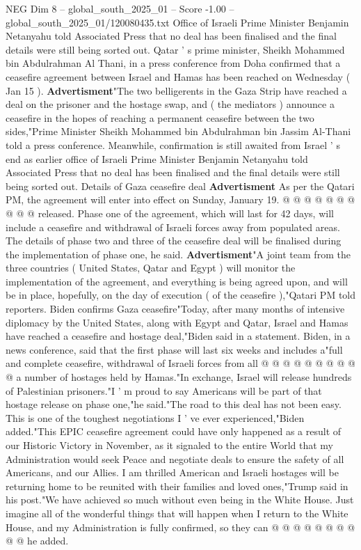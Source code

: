 \begin{textsample}{NEG Dim 8 – global\_south\_2025\_01 – Score -1.00 – global\_south\_2025\_01/120080435.txt}  \label{ex:f8_neg_134}
Office of Israeli Prime Minister Benjamin Netanyahu told Associated Press that no deal has been finalised and the final details were still being sorted out.
Qatar ' s prime minister, Sheikh Mohammed bin Abdulrahman Al Thani, in a press conference from Doha confirmed that a ceasefire agreement between Israel and Hamas has been reached on Wednesday ( Jan 15 ). \textbf{Advertisment}"The two belligerents in the Gaza Strip have reached a deal on the prisoner and the hostage swap, and ( the mediators ) announce a ceasefire in the hopes of reaching a permanent ceasefire between the two sides,"Prime Minister Sheikh Mohammed bin Abdulrahman bin Jassim Al-Thani told a press conference.
Meanwhile, confirmation is still awaited from Israel ' s end as earlier office of Israeli Prime Minister Benjamin Netanyahu told Associated Press that no deal has been finalised and the final details were still being sorted out.
Details of Gaza ceasefire deal \textbf{Advertisment} As per the Qatari PM, the agreement will enter into effect on Sunday, January 19. @ @ @ @ @ @ @ @ @ @ released.
Phase one of the agreement, which will last for 42 days, will include a ceasefire and withdrawal of Israeli forces away from populated areas.
The details of phase two and three of the ceasefire deal will be finalised during the implementation of phase one, he said. \textbf{Advertisment}"A joint team from the three countries ( United States, Qatar and Egypt ) will monitor the implementation of the agreement, and everything is being agreed upon, and will be in place, hopefully, on the day of execution ( of the ceasefire ),"Qatari PM told reporters.
Biden confirms Gaza ceasefire"Today, after many months of intensive diplomacy by the United States, along with Egypt and Qatar, Israel and Hamas have reached a ceasefire and hostage deal,"Biden said in a statement.
Biden, in a news conference, said that the first phase will last six weeks and includes a"full and complete ceasefire, withdrawal of Israeli forces from all @ @ @ @ @ @ @ @ @ @ a number of hostages held by Hamas."In exchange, Israel will release hundreds of Palestinian prisoners."I ' m proud to say Americans will be part of that hostage release on phase one,"he said."The road to this deal has not been easy.
This is one of the toughest negotiations I ' ve ever experienced,"Biden added."This EPIC ceasefire agreement could have only happened as a result of our Historic Victory in November, as it signaled to the entire World that my Administration would seek Peace and negotiate deals to ensure the safety of all Americans, and our Allies.
I am thrilled American and Israeli hostages will be returning home to be reunited with their families and loved ones,"Trump said in his post."We have achieved so much without even being in the White House.
Just imagine all of the wonderful things that will happen when I return to the White House, and my Administration is fully confirmed, so they can @ @ @ @ @ @ @ @ @ @ he added.

\end{textsample}
